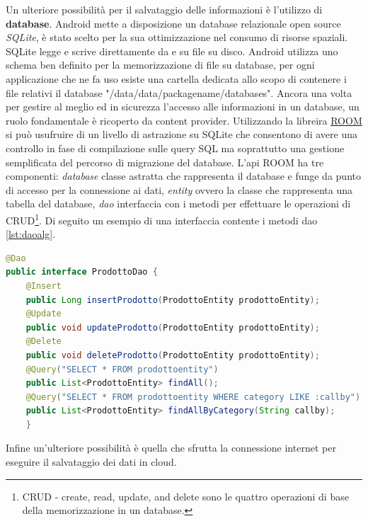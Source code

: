Un ulteriore possibilità per il salvataggio delle informazioni è l'utilizzo di \textbf{database}. Android mette a disposizione un database relazionale open source \textit{SQLite}, è stato scelto per la sua ottimizzazione nel consumo di risorse spaziali. SQLite legge e scrive direttamente da e su file su disco. Android utilizza uno schema ben definito per la memorizzazione di file su database, per ogni applicazione che ne fa uso esiste una cartella dedicata allo scopo di contenere i file relativi il database "/data/data/packagename/databases". Ancora una volta per gestire al meglio ed in sicurezza l'accesso alle informazioni in un database, un ruolo fondamentale è ricoperto da content provider. Utilizzando la libreira \href{https://developer.android.com/training/data-storage/room}{ROOM} si può usufruire di un livello di astrazione su SQLite che consentono di avere una controllo in fase di compilazione sulle query SQL ma soprattutto una gestione semplificata del percorso di migrazione del database. L'api ROOM ha tre componenti: \textit{database} classe astratta che rappresenta il database e funge da punto di accesso per la connessione ai dati, \textit{entity} ovvero la classe che rappresenta una tabella del database, \textit{dao} interfaccia con i metodi per effettuare le operazioni di CRUD\footnote{CRUD - create, read, update, and delete sono le quattro operazioni di base della memorizzazione in un database.}. Di seguito un esempio di una interfaccia contente i metodi dao \ref{lst:daoalg}.
\begin{lstlisting}[language=Java, caption=Dao example, label = lst:daoalg]
@Dao
public interface ProdottoDao {
    @Insert
    public Long insertProdotto(ProdottoEntity prodottoEntity);
    @Update
    public void updateProdotto(ProdottoEntity prodottoEntity);
    @Delete
    public void deleteProdotto(ProdottoEntity prodottoEntity);
    @Query("SELECT * FROM prodottoentity")
    public List<ProdottoEntity> findAll();
    @Query("SELECT * FROM prodottoentity WHERE category LIKE :callby")
    public List<ProdottoEntity> findAllByCategory(String callby);
    }
\end{lstlisting}
Infine un'ulteriore possibilità è quella che sfrutta la connessione internet per eseguire il salvataggio dei dati in cloud. 


